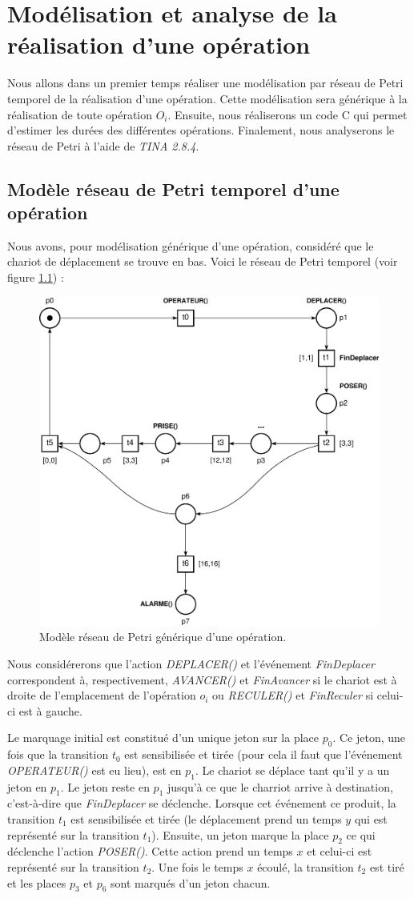 \chapter{Modélisation et analyse de la réalisation d'une opération}
Nous allons dans un premier temps réaliser une modélisation par réseau de Petri temporel de la réalisation d'une opération. Cette modélisation sera générique à la réalisation de toute opération $O_i$. Ensuite, nous réaliserons un code C qui permet d'estimer les durées des différentes opérations. Finalement, nous analyserons le réseau de Petri à l'aide de \emph{TINA 2.8.4}.

\section{Modèle réseau de Petri temporel d'une opération}
Nous avons, pour modélisation générique d'une opération, considéré que le chariot de déplacement se trouve en bas. Voici le réseau de Petri temporel (voir figure \ref{fig:RdPTempo_generique}) : \\
\begin{figure}[!ht]
\centering
\includegraphics[width=.57\textwidth]{./I/images/III-1_V3.pdf}
\caption{\label{fig:RdPTempo_generique}Modèle réseau de Petri générique d'une opération.}
\end{figure}


Nous considérerons que l'action \emph{DEPLACER()} et l'événement \emph{FinDeplacer} correspondent à, respectivement, \emph{AVANCER()} et \emph{FinAvancer} si le chariot est à droite de l'emplacement de l'opération $o_i$  ou \emph{RECULER()} et \emph{FinReculer} si celui-ci est à gauche.


Le marquage initial est constitué d'un unique jeton sur la place $p_0$. Ce jeton, une fois que la transition $t_0$ est sensibilisée et tirée (pour cela il faut que l'événement \emph{OPERATEUR()} est eu lieu), est en $p_1$. Le chariot se déplace tant qu'il y a un jeton en $p_1$. Le jeton reste en $p_1$ jusqu'à ce que le charriot arrive à destination, c'est-à-dire que \emph{FinDeplacer} se déclenche. Lorsque cet événement ce produit, la transition $t_1$ est sensibilisée et tirée (le déplacement prend un temps $y$ qui est représenté sur la transition $t_1$). Ensuite, un jeton marque la place $p_2$ ce qui déclenche l'action \emph{POSER()}. Cette action prend un temps $x$ et celui-ci est représenté sur la transition $t_2$. Une fois le temps $x$ écoulé, la transition $t_2$ est tiré et les places $p_3$ et $p_6$ sont marqués d'un jeton chacun. 

